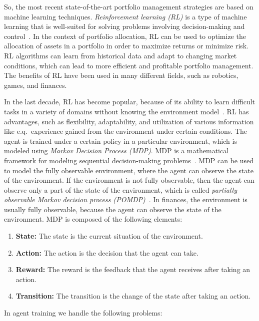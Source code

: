\documentclass[../xlapes02]{subfiles}
\begin{document}
    So, the most recent state-of-the-art portfolio management strategies are based on machine learning techniques. \emph{Reinforcement learning (RL)} is a type of machine learning that is well-suited for solving problems involving decision-making and control~\cite{sutton2018reinforcement}. In the context of portfolio allocation, RL can be used to optimize the allocation of assets in a portfolio in order to maximize returns or minimize risk. RL algorithms can learn from historical data and adapt to changing market conditions, which can lead to more efficient and profitable portfolio management. The benefits of RL have been used in many different fields, such as robotics, games, and finances.

    In the last decade, RL has become popular, because of its ability to learn difficult tasks in a variety of domains without knowing the environment model~\cite{sutton2018reinforcement}. RL has advantages, such as flexibility, adaptability, and utilization of various information like e.q.\ experience gained from the environment under certain conditions. The agent is trained under a certain policy in a particular environment, which is modeled using \emph{Markov Decision Process (MDP)}. MDP is a mathematical framework for modeling sequential decision-making problems~\cite{rao2022foundations}. MDP can be used to model the fully observable environment, where the agent can observe the state of the environment. If the environment is not fully observable, then the agent can observe only a part of the state of the environment, which is called \emph{partially observable Markov decision process (POMDP)}~\cite{kurniawati2021partially}. In finances, the environment is usually fully observable, because the agent can observe the state of the environment. MDP is composed of the following elements:
    \begin{enumerate}[label=\textbf{\arabic*}., ref=\arabic*]
        \item \textbf{State:} The state is the current situation of the environment.
        \item \textbf{Action:} The action is the decision that the agent can take.
        \item \textbf{Reward:} The reward is the feedback that the agent receives after taking an action.
        \item \textbf{Transition:} The transition is the change of the state after taking an action.
    \end{enumerate}
    In agent training we handle the following problems:
\end{document}
